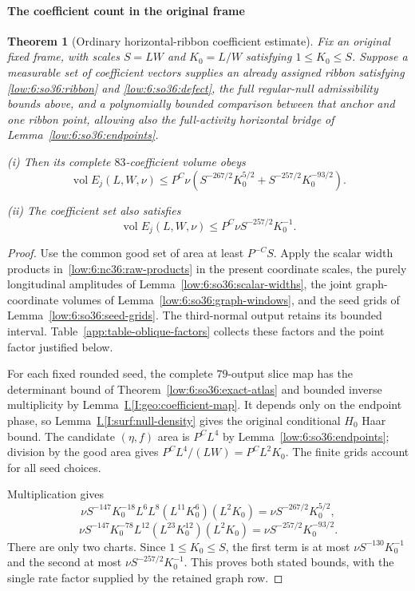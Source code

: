 \documentclass[11pt]{amsart}
\newtheorem{theorem}{Theorem}[section]
\theoremstyle{definition}
\theoremstyle{remark}
\numberwithin{equation}{section}
\newcommand{\partIref}[1]{\hyperref[I:#1]{I.\ref*{I:#1}}}
\begin{document}
\paragraph{The coefficient count in the original frame}

\begin{theorem}[Ordinary horizontal-ribbon coefficient estimate]\label{low:6:so36:count}
Fix an original fixed frame, with scales $S=LW$ and $K_0=L/W$ satisfying $1\le K_0\le S$. Suppose a measurable set of coefficient vectors supplies an already assigned ribbon satisfying \eqref{low:6:so36:ribbon} and \eqref{low:6:so36:defect}, the full regular-null admissibility bounds above, and a polynomially bounded comparison between that anchor and one ribbon point, allowing also the full-activity horizontal bridge of Lemma~\ref{low:6:so36:endpoints}.

\noindent\textup{(i)} Then its complete $83$-coefficient volume obeys
\begin{equation}\label{low:6:so36:two-tails}
\operatorname{vol}E_j(L,W,\nu)\le P^C\nu\left(S^{-267/2}K_0^{5/2}+S^{-257/2}K_0^{-93/2}\right).
\end{equation}

\noindent\textup{(ii)} The coefficient set also satisfies
\begin{equation}\label{low:6:so36:common-tail}
\operatorname{vol}E_j(L,W,\nu)\le P^C\nu S^{-257/2}K_0^{-1}.
\end{equation}
\end{theorem}
\begin{proof}
Use the common good set of area at least $P^{-C}S$. Apply the scalar width products in~\eqref{low:6:nc36:raw-products} in the present coordinate scales, the purely longitudinal amplitudes of Lemma~\ref{low:6:so36:scalar-widths}, the joint graph-coordinate volumes of Lemma~\ref{low:6:so36:graph-windows}, and the seed grids of Lemma~\ref{low:6:so36:seed-grids}. The third-normal output retains its bounded interval. Table~\ref{app:table-oblique-factors} collects these factors and the point factor justified below.

For each fixed rounded seed, the complete $79$-output slice map has the determinant bound of Theorem~\ref{low:6:so36:exact-atlas} and bounded inverse multiplicity by Lemma~\partIref{geo:coefficient-map}. It depends only on the endpoint phase, so Lemma~\partIref{surf:null-density} gives the original conditional $H_0$ Haar bound. The candidate $(\eta,f)$ area is $P^CL^4$ by Lemma~\ref{low:6:so36:endpoints}; division by the good area gives $P^CL^4/(LW)=P^CL^2K_0$. The finite grids account for all seed choices.

Multiplication gives
\[
\nu S^{-147}K_0^{-18}L^6L^8(L^{11}K_0^6)(L^2K_0)=\nu S^{-267/2}K_0^{5/2},
\]
\[
\nu S^{-147}K_0^{-78}L^{12}(L^{23}K_0^{12})(L^2K_0)=\nu S^{-257/2}K_0^{-93/2}.
\]
There are only two charts. Since $1\le K_0\le S$, the first term is at most $\nu S^{-130}K_0^{-1}$ and the second at most $\nu S^{-257/2}K_0^{-1}$. This proves both stated bounds, with the single rate factor supplied by the retained graph row.
\end{proof}
\end{document}
